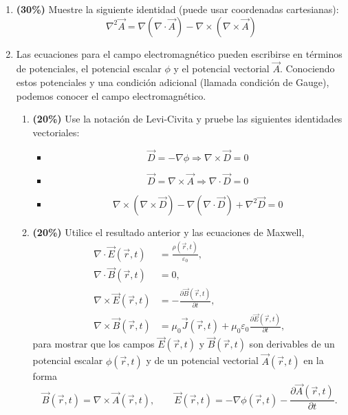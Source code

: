 \documentclass[a4paper]{article}
\begin{document}
\begin{enumerate}
    \item \textbf{(30\%)} Muestre la siguiente identidad (puede usar coordenadas cartesianas):
    \[
    \nabla^2 \vec{A} = \nabla(\nabla \cdot \vec{A}) - \nabla \times (\nabla \times \vec{A})
    \]

    \item Las ecuaciones para el campo electromagnético pueden escribirse en términos de potenciales, el potencial escalar $\phi$ y el potencial vectorial $\vec{A}$. Conociendo estos potenciales y una condición adicional (llamada condición de Gauge), podemos conocer el campo electromagnético.

    \begin{enumerate}
        \item[(a)] \textbf{(20\%)} Use la notación de Levi-Civita y pruebe las siguientes identidades vectoriales:
        \begin{itemize}
            \item
            \[
            \vec{D} = -\nabla \phi \Rightarrow \nabla \times \vec{D} = 0
            \]
            \item
            \[
            \vec{D} = \nabla \times \vec{A} \Rightarrow \nabla \cdot \vec{D} = 0
            \]
            \item
            \[
            \nabla \times (\nabla \times \vec{D}) - \nabla(\nabla \cdot \vec{D}) + \nabla^2 \vec{D} = 0
            \]
        \end{itemize}

        \item[(b)] \textbf{(20\%)} Utilice el resultado anterior y las ecuaciones de Maxwell,
        \begin{align}
        \nabla \cdot \vec{E}(\vec{r},t) &= \frac{\rho(\vec{r},t)}{\varepsilon_0}, \\
        \nabla \cdot \vec{B}(\vec{r},t) &= 0, \\
        \nabla \times \vec{E}(\vec{r},t) &= -\frac{\partial \vec{B}(\vec{r},t)}{\partial t}, \\
        \nabla \times \vec{B}(\vec{r},t) &= \mu_0 \vec{J}(\vec{r},t) + \mu_0\varepsilon_0 \frac{\partial \vec{E}(\vec{r},t)}{\partial t},
        \end{align}
        para mostrar que los campos $\vec{E}(\vec{r},t)$ y $\vec{B}(\vec{r},t)$ son derivables de un potencial escalar $\phi(\vec{r},t)$ y de un potencial vectorial $\vec{A}(\vec{r},t)$ en la forma
        \[
        \vec{B}(\vec{r},t)=\nabla \times \vec{A}(\vec{r},t),
        \qquad
        \vec{E}(\vec{r},t)=-\nabla\phi(\vec{r},t)-\frac{\partial \vec{A}(\vec{r},t)}{\partial t}.
        \]


\end{enumerate}
\end{enumerate}
\end{document}
